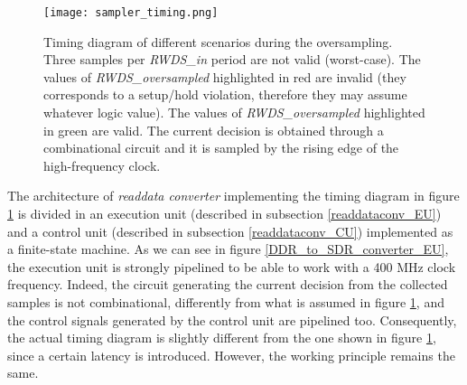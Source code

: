 \documentclass[10pt, english, a4paper, titlepage, oneside]{book}
\begin{document}
\vspace{6mm}
\begin{figure}[H]
    \centering
    \captionsetup{width=16cm}
    \texttt{[image: sampler\_timing.png]}
    \vspace{1mm}
    \caption{\centering Timing diagram of different scenarios during the oversampling. Three samples per \textit{RWDS\_in} period are not valid (worst-case). The values of \textit{RWDS\_oversampled} highlighted in red are invalid (they corresponds to a setup/hold violation, therefore they may assume whatever logic value). The values of \textit{RWDS\_oversampled} highlighted in green are valid. The current decision is obtained through a combinational circuit and it is sampled by the rising edge of the high-frequency clock.}
    \label{sampler_timing}
\end{figure}
\vspace{4mm}
\noindent The architecture of \textit{readdata converter} implementing the timing diagram in figure \ref{sampler_timing} is divided in an execution unit (described in subsection \ref{readdataconv_EU}) and a control unit (described in subsection \ref{readdataconv_CU}) implemented as a finite-state machine. As we can see in figure \ref{DDR_to_SDR_converter_EU}, the execution unit is strongly pipelined to be able to work with a 400 MHz clock frequency. Indeed, the circuit generating the current decision from the collected samples is not combinational, differently from what is assumed in figure \ref{sampler_timing}, and the control signals generated by the control unit are pipelined too. Consequently, the actual timing diagram is slightly different from the one shown in figure \ref{sampler_timing}, since a certain latency is introduced. However, the working principle remains the same.
\vspace{6mm}
\end{document}
